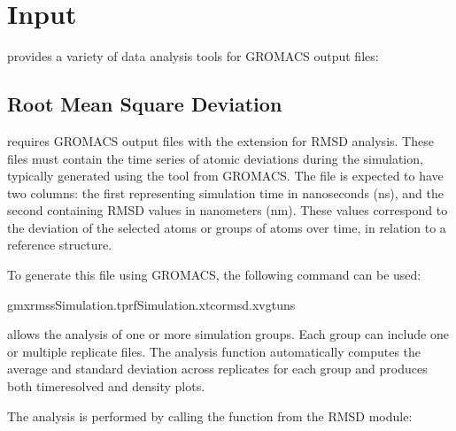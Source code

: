 \documentclass[a4paper,10pt,english]{sphinxmanual}
\begin{document}
\sphinxstepscope


\chapter{Input}
\label{\detokenize{Input:input}}\label{\detokenize{Input::doc}}
\sphinxAtStartPar
{} provides a variety of data analysis tools for GROMACS output files:


\section{Root Mean Square Deviation}
\label{\detokenize{Input:root-mean-square-deviation}}
\sphinxAtStartPar
{} requires GROMACS output files with the  extension for RMSD analysis. These files must contain the time series of atomic deviations during the simulation, typically generated using the  tool from GROMACS. The  file is expected to have two columns: the first representing simulation time in nanoseconds (ns), and the second containing RMSD values in nanometers (nm). These values correspond to the deviation of the selected atoms or groups of atoms over time, in relation to a reference structure.

\sphinxAtStartPar
To generate this file using GROMACS, the following command can be used:

\begin{sphinxVerbatim}[commandchars=\\\{\}]
gmxrms\PYGZhy{}sSimulation.tpr\PYGZhy{}fSimulation.xtc\PYGZhy{}ormsd.xvg\PYGZhy{}tuns
\end{sphinxVerbatim}

\sphinxAtStartPar
{} allows the analysis of one or more simulation groups. Each group can include one or multiple replicate  files. The analysis function automatically computes the average and standard deviation across replicates for each group and produces both time\sphinxhyphen{}resolved and density plots.

\sphinxAtStartPar
{}

\sphinxAtStartPar
The analysis is performed by calling the  function from the RMSD module:

\begin{sphinxVerbatim}[commandchars=\\\{\}]
 
\end{sphinxVerbatim}
\end{document}
